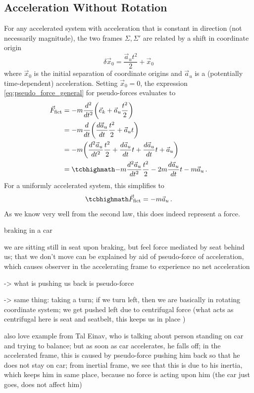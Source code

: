\documentclass[../class_mech_main.tex]{subfiles}
\begin{document}
		\subsection{Acceleration Without Rotation}
For any accelerated system with acceleration that is constant in direction (not necessarily magnitude), the two frames $\Sigma, \Sigma'$ are related by a shift in coordinate origin
\begin{equation}
	\delta \vec{x}_0 = \frac{\vec{a}_u t^2}{2} + \vec{x}_0
\end{equation}
where $\vec{x}_0$ is the initial separation of coordinate origins and $\vec{a}_u$ is a (potentially time-dependent) acceleration. Setting $\vec{x}_0 = 0$, the expression \eqref{eq:pseudo_force_general} for pseudo-forces evaluates to
\begin{align}
	\vec{F}_\mathrm{fict}&= - m \dv[2]{t} \qty(\unitvec{k} + \vec{a}_u \frac{t^2}{2})
	\notag\\
	&= - m \dv{t} \qty(\dv{\vec{a}_u}{t} \frac{t^2}{2} + \vec{a}_u t)
	\notag\\
	&= - m \qty(\dv[2]{\vec{a}_u}{t} \frac{t^2}{2} + \dv{\vec{a}_u}{t} t + \dv{\vec{a}_u}{t} t + \vec{a}_u)
	\notag\\
	&= \eqbox{
		- m \dv[2]{\vec{a}_u}{t} \frac{t^2}{2} - 2 m \dv{\vec{a}_u}{t} t - m \vec{a}_u
	}
	\, .
\end{align}
For a uniformly accelerated system, this simplifies to
\begin{equation}
	\eqbox{
		\vec{F}_\mathrm{fict} = - m \vec{a}_u
	} \, .
\end{equation}
As we know very well from the second law, this does indeed represent a force.



\begin{ex}[Car]
	braking in a car

	we are sitting still in seat upon braking, but feel force mediated by seat behind us; that we don't move can be explained by aid of pseudo-force of acceleration, which causes observer in the accelerating frame to experience no net acceleration

	-> what is pushing us back is pseudo-force


	-> same thing: taking a turn; if we turn left, then we are basically in rotating coordinate system; we get pushed left due to centrifugal force (what acts as centrifugal here is seat and seatbelt, this keeps us in place )


	also love example from Tal Einav, who is talking about person standing on car and trying to balance; but as soon as car accelerates, he falls off; in the accelerated frame, this is caused by pseudo-force pushing him back so that he does not stay on car; from inertial frame, we see that this is due to his inertia, which keeps him in same place, because no force is acting upon him (the car just goes, does not affect him)
\end{ex}
\end{document}
